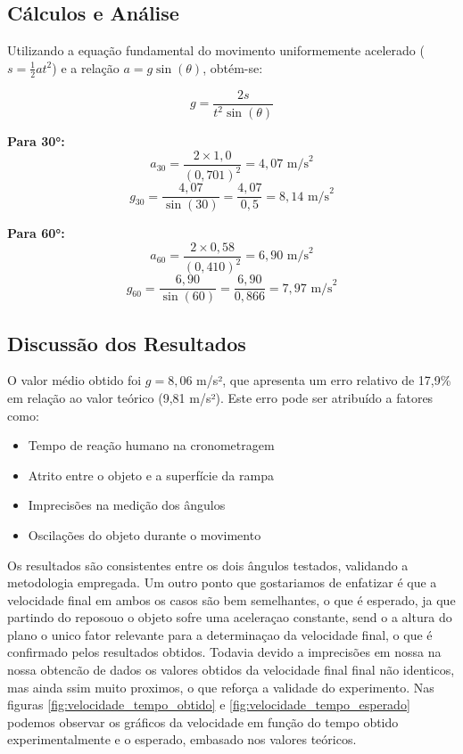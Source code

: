 \documentclass[a4paper, 12pt]{article}
\begin{document}
\subsection{Cálculos e Análise}

Utilizando a equação fundamental do movimento uniformemente acelerado ($s = \frac{1}{2}at^2$) e a relação $a = g \sin(\theta)$, obtém-se:

$$g = \frac{2s}{t^2 \sin(\theta)}$$

\textbf{Para 30°:}
$$a_{30} = \frac{2 \times 1,0}{(0,701)^2} = 4,07 \text{ m/s}^2$$
$$g_{30} = \frac{4,07}{\sin(30)} = \frac{4,07}{0,5} = 8,14 \text{ m/s}^2$$

\textbf{Para 60°:}
$$a_{60} = \frac{2 \times 0,58}{(0,410)^2} = 6,90 \text{ m/s}^2$$
$$g_{60} = \frac{6,90}{\sin(60)} = \frac{6,90}{0,866} = 7,97 \text{ m/s}^2$$

\subsection{Discussão dos Resultados}

O valor médio obtido foi $g = 8,06$ m/s², que apresenta um erro relativo de 17,9\% em relação ao valor teórico (9,81 m/s²). Este erro pode ser atribuído a fatores como:
\begin{itemize}
	\item Tempo de reação humano na cronometragem
	\item Atrito entre o objeto e a superfície da rampa
	\item Imprecisões na medição dos ângulos
	\item Oscilações do objeto durante o movimento
\end{itemize}

Os resultados são consistentes entre os dois ângulos testados, validando a metodologia empregada.
Um outro ponto que gostariamos de enfatizar é que a velocidade final em ambos os casos são bem semelhantes, o que é esperado, ja que partindo do reposouo o objeto sofre uma aceleraçao constante, send o a altura do plano o unico fator relevante para a determinaçao da velocidade final, o que é confirmado pelos resultados obtidos.
Todavia devido a imprecisões em nossa na nossa obtencão de dados os valores obtidos da velocidade final final não identicos, mas ainda ssim muito proximos, o que reforça a validade do experimento.
Nas figuras \ref{fig:velocidade_tempo_obtido} e \ref{fig:velocidade_tempo_esperado} podemos observar os gráficos da velocidade em função do tempo obtido experimentalmente e o esperado, embasado nos valores teóricos.
\end{document}
